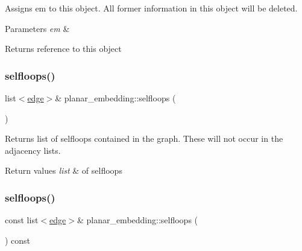 Assigns {\ttfamily em} to this object. All former information in this object will be deleted.


\begin{DoxyParams}{Parameters}
{\em em} & \\
\hline
\end{DoxyParams}
\begin{DoxyReturn}{Returns}
reference to this object 
\end{DoxyReturn}
\mbox{\label{classplanar__embedding_ab04859be18352bc53a120b0676a499ba}} 
\subsubsection{\texorpdfstring{selfloops()}{selfloops()}\hspace{0.1cm}{\footnotesize\ttfamily [1/2]}}
{\footnotesize\ttfamily list$<$\mbox{\hyperlink{classedge}{edge}}$>$\& planar\+\_\+embedding\+::selfloops (\begin{DoxyParamCaption}{ }\end{DoxyParamCaption})\hspace{0.3cm}{\ttfamily [inline]}}

Returns list of selfloops contained in the graph. These will not occur in the adjacency lists.


\begin{DoxyRetVals}{Return values}
{\em list} & of selfloops \\
\hline
\end{DoxyRetVals}
\mbox{\label{classplanar__embedding_a25e47defbdda4552bf1ff98a3e7682e5}} 
\subsubsection{\texorpdfstring{selfloops()}{selfloops()}\hspace{0.1cm}{\footnotesize\ttfamily [2/2]}}
{\footnotesize\ttfamily const list$<$\mbox{\hyperlink{classedge}{edge}}$>$\& planar\+\_\+embedding\+::selfloops (\begin{DoxyParamCaption}{ }\end{DoxyParamCaption}) const\hspace{0.3cm}{\ttfamily [inline]}}

